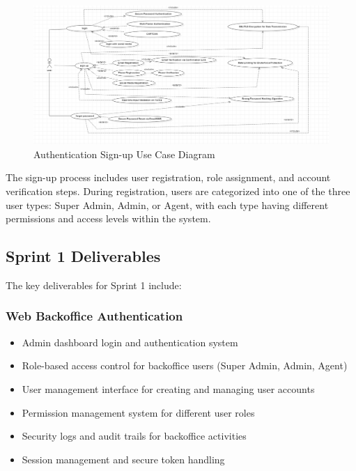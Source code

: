 \begin{figure}[ht!]
    \centering
    \includegraphics[width=1\textwidth]{images/diagram_de_case_d_utilisation_signup.png}
    \caption{Authentication Sign-up Use Case Diagram}
    \label{fig:signup-diagram}
\end{figure}

\newpage

The sign-up process includes user registration, role assignment, and account verification steps. During registration, users are categorized into one of the three user types: Super Admin, Admin, or Agent, with each type having different permissions and access levels within the system.

\subsection{Sprint 1 Deliverables}
The key deliverables for Sprint 1 include:

\subsubsection{Web Backoffice Authentication}
\begin{itemize}
    \item Admin dashboard login and authentication system
    \item Role-based access control for backoffice users (Super Admin, Admin, Agent)
    \item User management interface for creating and managing user accounts
    \item Permission management system for different user roles
    \item Security logs and audit trails for backoffice activities
    \item Session management and secure token handling
\end{itemize}
